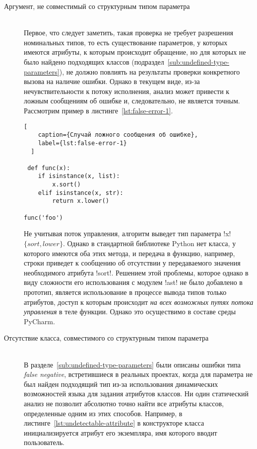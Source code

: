 \begin{description} 

\item[Аргумент, не совместимый со структурным типом параметра] \hfill \\ 
  Первое, что следует заметить, такая проверка не требует разрешения
  номинальных типов, то есть существование параметров, у которых имеются
  атрибуты, к которым происходит обращение, но для которых не было найдено
  подходящих классов (подраздел~\ref{sub:undefined-type-parameters}), не должно повлиять на результаты
  проверки конкретного вызова на наличие ошибки. Однако в текущем виде, из-за
  нечувствительности к потоку исполнения, анализ может привести к ложным
  сообщениям об ошибке и, следовательно, не является точным. Рассмотрим пример в
  листинге~\ref{lst:false-error-1}. 

  \begin{lstlisting}[
    caption={Случай ложного сообщения об ошибке},
    label={lst:false-error-1}
  ]

 def func(x):
    if isinstance(x, list):
        x.sort()
    elif isinstance(x, str):
        return x.lower()

func('foo')     
  \end{lstlisting}
    
  Не учитывая поток управления, алгоритм выведет тип параметра !x! $\{ sort,
  lower \}$. Однако в стандартной библиотеке Python нет класса, у которого
  имеются оба этих метода, и передача в функцию, например, строки приведет к сообщению об
  отсутствии у передаваемого значения необходимого атрибута !sort!. Решением
  этой проблемы, которое однако в виду сложности его использования с модулем
  !ast! не было добавлено в прототип, является использование в процессе вывода
  типов только атрибутов, доступ к которым происходит \emph{на всех возможных путях
  потока управления} в теле функции. Однако это осуществимо в составе среды
  PyCharm.

\item[Отсутствие класса, совместимого со структурным типом параметра] \hfill \\
  В разделе~\ref{sub:undefined-type-parameters} были описаны ошибки типа
  \emph{false negative}, встретившиеся в реальных проектах, когда для параметра
  не был найден подходящий тип из-за использования динамических возможностей
  языка для задания атрибутов классов. Ни один
  статический анализ не позволит абсолютно точно найти все атрибуты классов,
  определенные одним из этих способов. Например, в
  листинге~\ref{lst:undetectable-attribute} в конструкторе класса инициализируется
  атрибут его экземпляра, имя которого вводит пользователь.


\end{description}
